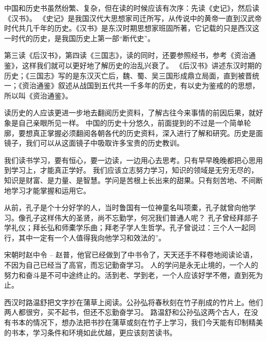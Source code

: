 \documentclass[avery5371,grid]{flashcards}
\begin{document}
{中国和历史书虽然纷繁、复杂，但在读的时候应该有次序：先读《史记》，然后读《汉书》。} %
{《史记》是我国汉代大思想家司迁所写，从传说中的黄帝一直到汉武帝时代共几千年的历史。《汉书》是东汉时期思想家班固所著，它记载的只是西汉这一时代的历史，是我国历史上第一部“断代史”。} %

{第三读《后汉书》，第四读《三国志》，读的同时，还要参照经书，参考《资治通鉴》，这样我们就可以更好地了解历史的治乱兴衰了。} %
{《后汉书》讲述东汉时期的历史；《三国志》写的是东汉灭亡后，魏、蜀、吴三国形成鼎立局面，直到被晋统一；《资治通鉴》叙述从战国到五代共一千多年的历史，有以史为鉴戒的的思想，所以叫《资治通鉴》。} %

{读历史的人应该更进一步地去翻阅历史资料，了解古往今来事情的前因后果，就好象是自己亲眼所见一样。} %
{中国的历史十分悠久，前面提到的不过是一个简单轮廓，要想真正掌握必须翻阅各朝各代的历史资料，深入进行了解和研究。历史是面镜子，我们可以从这面镜子中吸取许多宝贵的历史教训。} %

{我们读书学习，要有恒心，要一边读，一边用心去思考。只有早早晚晚都把心思用到学习上，才能真正学好。} %
{我们应该立志努力学习，知识的领域是无穷无尽的，知识是财富、是力量、是智慧。学问是苦根上长出来的甜果。只有刻苦地、不间断地学习才能掌握和运用它。} %

{从前，孔子是个十分好学的人，当时鲁国有一位神童名叫项橐，孔子就曾向他学习。像孔子这样伟大的圣贤，尚不忘勤学，何况我们普通人呢？} %
{孔子曾经拜郯子学礼仪；拜长弘和师橐学乐曲；拜老子学人生哲学。孔子曾说过：三个人一起同行，其中一定有一个人值得我向他学习和效法的”。} %

{宋朝时赵中令 -- 赵普，他官已经做到了中书令了，天天还手不释卷地阅读论语，不因为自己已经当了高官，而忘记勤奋学习。} %
{人的学问是永无止境的，一个人的努力和奋斗是不可中途终止的。活到老、学到老，一个人应该好学不倦，直到死为止。} %

{西汉时路温舒把文字抄在蒲草上阅读。公孙弘将春秋刻在竹子削成的竹片上。他们两人都很穷，买不起书，但还不忘勤奋学习。} %
{路温舒和公孙弘这两个古人，在没有书本的情况下，想办法把书抄在蒲草或刻在竹子上学习，我们今天能有印制精美的书本，学习条件和环境如此优越，更应该刻苦读书。} %
\end{document}
